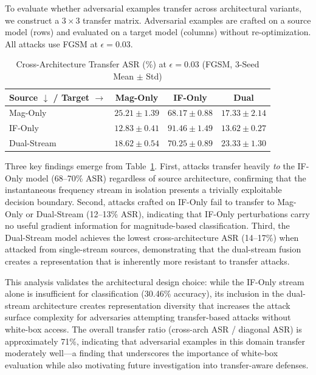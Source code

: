 \documentclass[conference]{IEEEtran}
\begin{document}
\label{sec:transferability}

To evaluate whether adversarial examples transfer across architectural variants, we construct a $3 \times 3$ transfer matrix. Adversarial examples are crafted on a source model (rows) and evaluated on a target model (columns) without re-optimization. All attacks use FGSM at $\epsilon = 0.03$.

\begin{table}[t]
\centering
\caption{Cross-Architecture Transfer ASR (\%) at $\epsilon=0.03$ (FGSM, 3-Seed Mean $\pm$ Std)}\label{tab:transfer}
\begin{tabular}{lccc}
\toprule
\textbf{Source} $\downarrow$ / \textbf{Target} $\rightarrow$ & \textbf{Mag-Only} & \textbf{IF-Only} & \textbf{Dual} \\
\midrule
Mag-Only    & $25.21 \pm 1.39$ & $68.17 \pm 0.88$ & $17.33 \pm 2.14$ \\
IF-Only     & $12.83 \pm 0.41$ & $91.46 \pm 1.49$ & $13.62 \pm 0.27$ \\
Dual-Stream & $18.62 \pm 0.54$ & $70.25 \pm 0.89$ & $23.33 \pm 1.30$ \\
\bottomrule
\end{tabular}
\end{table}

Three key findings emerge from Table~\ref{tab:transfer}. First, attacks transfer heavily \textit{to} the IF-Only model (68--70\% ASR) regardless of source architecture, confirming that the instantaneous frequency stream in isolation presents a trivially exploitable decision boundary. Second, attacks crafted on IF-Only fail to transfer to Mag-Only or Dual-Stream (12--13\% ASR), indicating that IF-Only perturbations carry no useful gradient information for magnitude-based classification. Third, the Dual-Stream model achieves the lowest cross-architecture ASR (14--17\%) when attacked from single-stream sources, demonstrating that the dual-stream fusion creates a representation that is inherently more resistant to transfer attacks.

This analysis validates the architectural design choice: while the IF-Only stream alone is insufficient for classification (30.46\% accuracy), its inclusion in the dual-stream architecture creates representation diversity that increases the attack surface complexity for adversaries attempting transfer-based attacks without white-box access. The overall transfer ratio (cross-arch ASR / diagonal ASR) is approximately 71\%, indicating that adversarial examples in this domain transfer moderately well---a finding that underscores the importance of white-box evaluation while also motivating future investigation into transfer-aware defenses.
\end{document}
